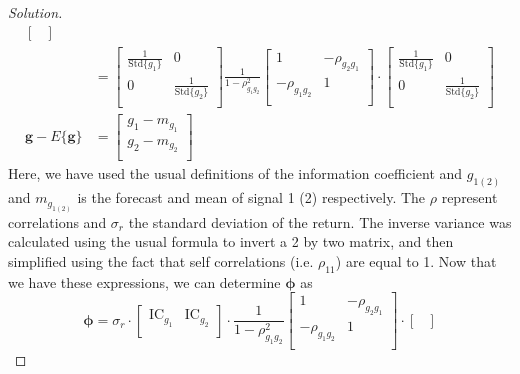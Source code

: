 \begin{proof}[Solution]
\begin{align*}
\begin{bmatrix}
				  \end{bmatrix}\\
				&=\begin{bmatrix}
				   \frac{1}{\mathrm{Std}\{g_{1}\}}	&	0 			\\
				   0				&	\frac{1}{\mathrm{Std}\{g_{2}\}}   \\
				  \end{bmatrix}
				  \frac{1}{1-\rho_{g_{1}g_{2}}^{2}}
				  \begin{bmatrix}
				   1	&	-\rho_{g_{2}g_{1}}   \\
				   -\rho_{g_{1}g_{2}}	&	 1   \\
				  \end{bmatrix}
				  \cdot\begin{bmatrix}
				   \frac{1}{\mathrm{Std}\{g_{1}\}}	&	0 			\\
				   0				&	\frac{1}{\mathrm{Std}\{g_{2}\}}   \\
				  \end{bmatrix}\\
    \bm{g}-E\{\bm{g}\}		&= \begin{bmatrix}
                      		    g_{1} - m_{g_{1}} \\
                      		    g_{2} - m_{g_{2}} \\
                      		   \end{bmatrix}
  \end{align*}
  Here, we have used the usual definitions of the information coefficient and $g_{1(2)}$ and $m_{g_{1(2)}}$ is the forecast and mean of signal 1 (2) respectively. The $\rho$ represent correlations and $\sigma_{r}$ the standard deviation of the return. The inverse variance was calculated using the usual formula to invert a 2 by two matrix, and then simplified using the fact that self correlations (i.e. $\rho_{11}$) are equal to 1. Now that we have these expressions, we can determine $\bm{\phi}$ as
  \begin{equation*}
   \bm{\phi}=\sigma_{r}\cdot
		\begin{bmatrix}
		  \mathrm{IC}_{g_{1}} & \mathrm{IC}_{g_{2}} \\
		\end{bmatrix}
		\cdot
		\frac{1}{1-\rho_{g_{1}g_{2}}^{2}}
		\begin{bmatrix}
		    1	   &	-\rho_{g_{2}g_{1}}   \\
		   -\rho_{g_{1}g_{2}}	&	 1   \\
		\end{bmatrix}
		\cdot\begin{bmatrix}

\end{bmatrix}
\end{equation*}
\end{proof}
